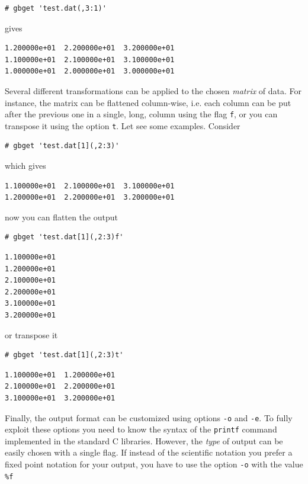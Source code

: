 \documentclass[11pt]{article}
\begin{document}
\begin{verbatim}
# gbget 'test.dat(,3:1)'
\end{verbatim}

gives

\begin{verbatim}
1.200000e+01  2.200000e+01  3.200000e+01
1.100000e+01  2.100000e+01  3.100000e+01
1.000000e+01  2.000000e+01  3.000000e+01
\end{verbatim}

Several different transformations can be applied to the chosen
\emph{matrix} of data.  For instance, the matrix can be flattened
column-wise, i.e. each column can be put after the previous one in a
single, long, column using the flag \verb~f~, or you can transpose it
using the option \verb~t~. Let see some examples. Consider

\begin{verbatim}
# gbget 'test.dat[1](,2:3)'
\end{verbatim}

which gives

\begin{verbatim}
1.100000e+01  2.100000e+01  3.100000e+01
1.200000e+01  2.200000e+01  3.200000e+01
\end{verbatim}

now you can flatten the output

\begin{verbatim}
# gbget 'test.dat[1](,2:3)f'
\end{verbatim}

\begin{verbatim}
1.100000e+01
1.200000e+01
2.100000e+01
2.200000e+01
3.100000e+01
3.200000e+01
\end{verbatim}

or transpose it

\begin{verbatim}
# gbget 'test.dat[1](,2:3)t'
\end{verbatim}

\begin{verbatim}
1.100000e+01  1.200000e+01
2.100000e+01  2.200000e+01
3.100000e+01  3.200000e+01
\end{verbatim}

Finally, the output format can be customized using options \verb~-o~ and
\verb~-e~. To fully exploit these options you need to know the syntax of
the \texttt{printf} command implemented in the standard C libraries. However,
the \emph{type} of output can be easily chosen with a single flag. If
instead of the scientific notation you prefer a fixed point notation
for your output, you have to use the option \verb~-o~ with the value \verb~%f~
\end{document}
